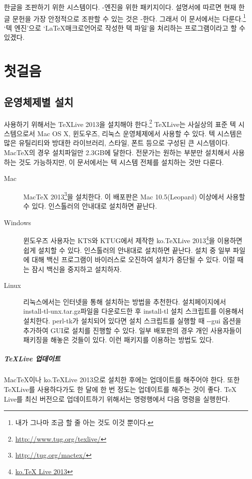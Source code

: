 \documentclass[oneside, chapter, 11pt]{oblivoir}
\begin{document}
  한글을 조판하기 위한 시스템이다. \XeTeX- \XeTeX 엔진을 위한 \koTeX 패키지이다.  설명서에 따르면 현재 한글 문헌을 가장 안정적으로 조판할 수 있는 것은 \XeTeX- 한다. 그래서 이 문서에서는  다룬다.\footnote{내가 그나마 조금 할 줄 아는 것도 이것 뿐이다.}  ` 텍 엔진'으로 `\LaTeX 매크로언어로 작성한 텍 파일'을 처리하는 프로그램이라고 할 수 있겠다.

\mainmatter
\chapter{첫걸음}
\section{운영체제별 설치}
 사용하기 위해서는 TeXLive 2013을 설치해야 한다.\footnote{\href{http://www.tug.org/texlive/}{http://www.tug.org/texlive/}} TeXLive는 사실상의 표준 텍 시스템으로서 Mac OS X, 윈도우즈, 리눅스 운영체제에서 사용할 수 있다. 텍 시스템은 많은 유틸리티와 방대한 라이브러리, 스타일, 폰트 등으로 구성된 큰 시스템이다. MacTeX의 경우 설치파일만 2.3GB에 달한다. 전문가는 원하는 부분만 설치해서 사용하는 것도 가능하지만, 이 문서에서는 텍 시스템 전체를 설치하는 것만 다룬다.

\begin{description}
\item[Mac] MacTeX 2013\footnote{\href{http://tug.org/mactex/}{http://tug.org/mactex/}}을 설치한다. 이 배포판은 Mac 10.5(Leopard) 이상에서 사용할 수 있다. 인스톨러의 안내대로 설치하면 끝난다.
\item[Windows] 윈도우즈 사용자는 KTS와 KTUG에서 제작한 ko.TeXLive 2013\footnote{\href{http://www.ktug.org/xe/index.php?mid=KTUG_open_board&document_srl=175806}{ko.TeX Live 2013}}을 이용하면 쉽게 설치할 수 있다. 인스톨러의 안내대로 설치하면 끝난다. 설치 중 일부 파일에 대해 백신 프로그램이 바이러스로 오진하여 설치가 중단될 수 있다. 이럴 때는 잠시 백신을 중지하고 설치하자.
\item[Linux] 리눅스에서는 인터넷을 통해 설치하는 방법을 추천한다. 설치페이지에서 install-tl-unx.tar.gz파일을 다운로드한 후 install-tl 설치 스크립트를 이용해서 설치한다. perl-tk가 설치되어 있다면 설치 스크립트를 실행할 때 -{}-gui 옵션을 추가하여 GUI로 설치를 진행할 수 있다. 일부 배포판의 경우 개인 사용자들이 패키징을 해놓은 것들이 있다. 이런 패키지를 이용하는 방법도 있다.
\end{description}

\paragraph{TeXLive 업데이트}
MacTeX이나 ko.TeXLive 2013으로 설치한 후에는 업데이트를 해주어야 한다. 또한 TeXLive를 사용하다가도 한 달에 한 번 정도는 업데이트를 해주는 것이 좋다. TeX Live를 최신 버전으로 업데이트하기 위해서는 명령행에서 다음 명령을 실행한다.
\end{document}
